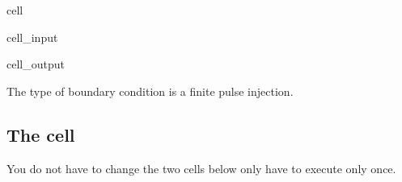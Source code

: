 \documentclass[letterpaper,10pt,english]{jupyterBook}
\begin{document}
\begin{sphinxuseclass}{cell}
\begin{sphinxVerbatimInput}
\begin{sphinxuseclass}{cell_input}
\end{sphinxuseclass}\end{sphinxVerbatimInput}
\begin{sphinxVerbatimOutput}

\begin{sphinxuseclass}{cell_output}
\begin{sphinxVerbatim}[commandchars=\\\{\}]
The type of boundary condition is a finite pulse injection.
\end{sphinxVerbatim}

\end{sphinxuseclass}\end{sphinxVerbatimOutput}

\end{sphinxuseclass}

\subsection{The   cell}
\label{\detokenize{content/tools/1D_advection_dispersion:the-main-function-cell}}
\sphinxAtStartPar
You do not have to change the two cells below only have to execute only once.
\end{document}

